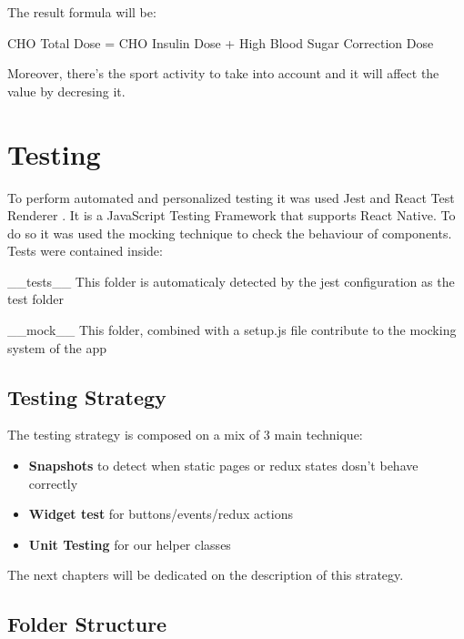 \documentclass[12pt,hidelinks]{article}
\begin{document}
The result formula will be:

\begin{center} 
CHO Total Dose = CHO Insulin Dose + High Blood Sugar Correction Dose
\end{center}

Moreover, there's the sport activity to take into account and it will affect the value
by decresing it. 


\newpage
{}
\section{Testing}
\vspace{10.5cm}

To perform automated and personalized testing it was used Jest \cite{Jest} and React Test Renderer \cite{testRenderer}. It is a JavaScript Testing Framework that supports React Native.
To do so it was used the mocking technique to check the behaviour of components.\\
Tests were contained inside:
\begin{docCommand}{__tests__}{}
	This folder is automaticaly detected by the jest configuration as the test folder
\end{docCommand}
\begin{docCommand}{__mock__}{}
	This folder, combined with a setup.js file contribute to the mocking system of the app
\end{docCommand}
\subsection{Testing Strategy}
The testing strategy is composed on a mix of 3 main technique:
\begin{itemize}
	\item \textbf{Snapshots} to detect when static pages or redux states dosn't behave correctly
 	\item \textbf{Widget test} for buttons/events/redux actions
  	\item \textbf{Unit Testing} for our helper classes
\end{itemize}
The next chapters will be dedicated on the description of this strategy.

\subsection{Folder Structure}
\end{document}
